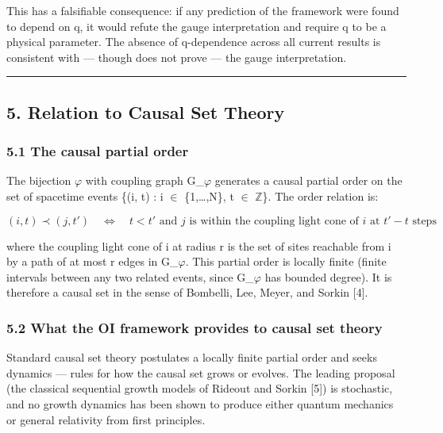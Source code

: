 \documentclass[
  11pt,
]{article}
\begin{document}
This has a falsifiable consequence: if any prediction of the framework
were found to depend on q, it would refute the gauge interpretation and
require q to be a physical parameter. The absence of q-dependence across
all current results is consistent with --- though does not prove --- the
gauge interpretation.

\begin{center}\rule{0.5\linewidth}{0.5pt}\end{center}

\hypertarget{relation-to-causal-set-theory}{%
\subsection{5. Relation to Causal Set
Theory}\label{relation-to-causal-set-theory}}

\hypertarget{the-causal-partial-order}{%
\subsubsection{5.1 The causal partial
order}\label{the-causal-partial-order}}

The bijection \ensuremath{\varphi} with coupling graph G\_\ensuremath{\varphi} generates a causal partial
order on the set of spacetime events \{(i, t) : i \ensuremath{\in} \{1,\ldots,N\}, t \ensuremath{\in}
\ensuremath{\mathbb{Z}}\}. The order relation is:

\[(i, t) \prec (j, t') \quad \iff \quad t < t' \text{ and } j \text{ is within the coupling light cone of } i \text{ at } t' - t \text{ steps}\]

where the coupling light cone of i at radius r is the set of sites
reachable from i by a path of at most r edges in G\_\ensuremath{\varphi}. This partial
order is locally finite (finite intervals between any two related
events, since G\_\ensuremath{\varphi} has bounded degree). It is therefore a causal set in
the sense of Bombelli, Lee, Meyer, and Sorkin {[}4{]}.

\hypertarget{what-the-oi-framework-provides-to-causal-set-theory}{%
\subsubsection{5.2 What the OI framework provides to causal set
theory}\label{what-the-oi-framework-provides-to-causal-set-theory}}

Standard causal set theory postulates a locally finite partial order and
seeks dynamics --- rules for how the causal set grows or evolves. The
leading proposal (the classical sequential growth models of Rideout and
Sorkin {[}5{]}) is stochastic, and no growth dynamics has been shown to
produce either quantum mechanics or general relativity from first
principles.
\end{document}
